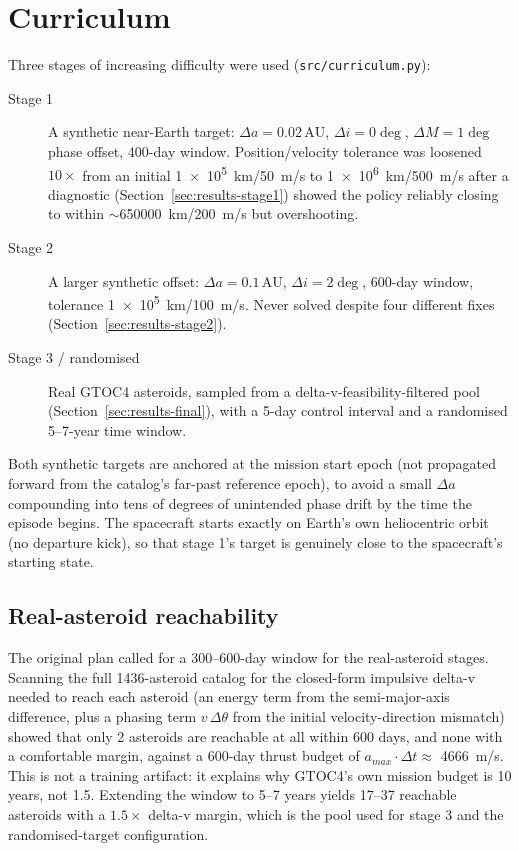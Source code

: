 \section{Curriculum}
\label{sec:curriculum}

Three stages of increasing difficulty were used (\texttt{src/curriculum.py}):

\begin{description}
  \item[Stage 1] A synthetic near-Earth target: $\Delta a = 0.02\,\mathrm{AU}$,
    $\Delta i = 0\deg$, $\Delta M = 1\deg$ phase offset, 400-day window. Position/velocity
    tolerance was loosened $10\times$ from an initial \SI{1e5}{km}/\SI{50}{m/s} to
    \SI{1e6}{km}/\SI{500}{m/s} after a diagnostic (Section~\ref{sec:results-stage1}) showed the
    policy reliably closing to within $\sim$\SI{650000}{km}/\SI{200}{m/s} but overshooting.
  \item[Stage 2] A larger synthetic offset: $\Delta a = 0.1\,\mathrm{AU}$, $\Delta i = 2\deg$,
    600-day window, tolerance \SI{1e5}{km}/\SI{100}{m/s}. Never solved despite four different
    fixes (Section~\ref{sec:results-stage2}).
  \item[Stage 3 / randomised] Real GTOC4 asteroids, sampled from a delta-v-feasibility-filtered
    pool (Section~\ref{sec:results-final}), with a 5-day control interval and a randomised
    5--7-year time window.
\end{description}

Both synthetic targets are anchored at the mission start epoch (not propagated forward from the
catalog's far-past reference epoch), to avoid a small $\Delta a$ compounding into tens of degrees
of unintended phase drift by the time the episode begins. The spacecraft starts exactly on
Earth's own heliocentric orbit (no departure kick), so that stage 1's target is genuinely close
to the spacecraft's starting state.

\subsection{Real-asteroid reachability}
\label{sec:reachability}

The original plan called for a 300--600-day window for the real-asteroid stages. Scanning the
full 1436-asteroid catalog for the closed-form impulsive delta-v needed to reach each asteroid
(an energy term from the semi-major-axis difference, plus a phasing term $v\,\Delta\theta$ from
the initial velocity-direction mismatch) showed that only 2 asteroids are reachable at all within
600 days, and none with a comfortable margin, against a 600-day thrust budget of
$a_{max}\cdot\Delta t \approx$ \SI{4666}{m/s}. This is not a training artifact: it explains why
GTOC4's own mission budget is 10 years, not 1.5. Extending the window to 5--7 years yields 17--37
reachable asteroids with a $1.5\times$ delta-v margin, which is the pool used for stage 3 and the
randomised-target configuration.

